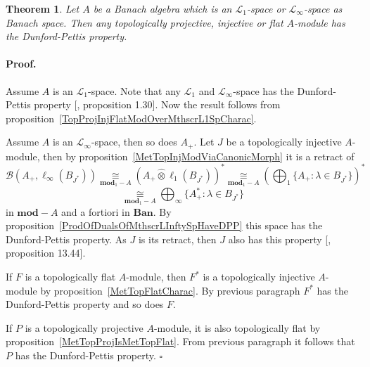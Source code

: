\documentclass[12pt]{article}
\newcommand{\projtens}{\mathbin{\widehat{\otimes}}}
\newcommand{\isom}[1]{\mathop{\mathbin{\cong}}\limits_{#1}}
\newtheorem{theorem}{Theorem}[section]
\renewenvironment{proof}{\paragraph{Proof.}}{\hfill$\square$\medskip}
\begin{document}
\begin{theorem}\label{TopProjInjFlatModOverMthscrL1OrLInftySpHaveDPP} Let $A$ be
    a Banach algebra which is an $\mathscr{L}_1$-space or
    $\mathscr{L}_\infty$-space as Banach space. Then any topologically
    projective, injective or flat $A$-module has the Dunford-Pettis property.
\end{theorem}
\begin{proof} Assume $A$ is an $\mathscr{L}_1$-space. Note that any
    $\mathscr{L}_1$ and $\mathscr{L}_\infty$-space has the Dunford-Pettis
    property [\cite{BourgNewClOfLpSp}, proposition 1.30]. Now the result follows
    from proposition~\ref{TopProjInjFlatModOverMthscrL1SpCharac}.

    Assume $A$ is an $\mathscr{L}_\infty$-space, then so does $A_+$. Let $J$ be
    a topologically injective $A$-module, then by
    proposition~\ref{MetTopInjModViaCanonicMorph} it is a retract of
    $$
        \mathcal{B}(A_+,\ell_\infty(B_{J^*}))
        \isom{\mathbf{mod}_1-A}
        {(A_+\projtens\ell_1(B_{J^*}))}^*\isom{\mathbf{mod}_1-A}
        {\left(\bigoplus\nolimits_1\{ A_+:\lambda\in B_{J^*}\}\right)}^*
    $$
    $$
        \isom{\mathbf{mod}_1-A}
        \bigoplus\nolimits_\infty \{ A_+^*:\lambda\in B_{J^*} \}
    $$
    in $\mathbf{mod}-A$ and a fortiori in $\mathbf{Ban}$. By
    proposition~\ref{ProdOfDualsOfMthscrLInftySpHaveDPP} this space has the
    Dunford-Pettis property. As $J$ is its retract, then $J$ also has this
    property [\cite{FabHabBanSpTh}, proposition 13.44].

    If $F$ is a topologically flat $A$-module, then $F^*$ is a topologically
    injective $A$-module by proposition~\ref{MetTopFlatCharac}. By previous
    paragraph $F^*$ has the Dunford-Pettis property and so does $F$.

    If $P$ is a topologically projective $A$-module, it is also topologically
    flat by proposition~\ref{MetTopProjIsMetTopFlat}. From previous paragraph it
    follows that $P$ has the Dunford-Pettis property.
\end{proof}
\end{document}
